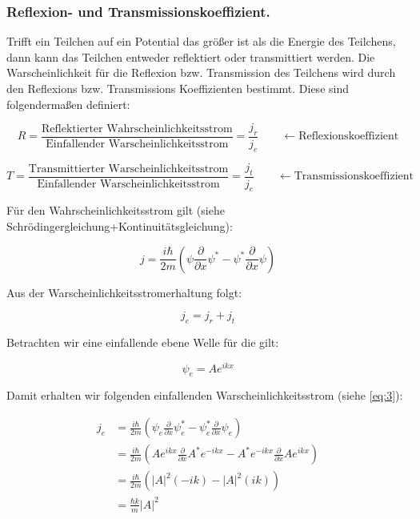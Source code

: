 \subsubsection{Reflexion- und Transmissionskoeffizient.}

Trifft ein Teilchen auf ein Potential das größer ist als die Energie des Teilchens, dann kann das Teilchen entweder reflektiert oder transmittiert werden. Die Warscheinlichkeit für die Reflexion bzw. Transmission des Teilchens wird durch den Reflexions bzw. Transmissions Koeffizienten bestimmt. Diese sind folgendermaßen definiert:

\begin{equation}
  \label{eq:1}
  R = \frac{\text{Reflektierter Wahrscheinlichkeitsstrom}}{\text{Einfallender Warscheinlichkeitsstrom}}  = \frac{j_{r}}{j_{e}}\qquad \leftarrow  \text{Reflexionskoeffizient}
\end{equation}

\begin{equation}
  \label{eq:2}
  T = \frac{\text{Transmittierter Warscheinlichkeitsstrom}}{\text{Einfallender Warscheinlichkeitsstrom}}  = \frac{j_{t}}{j_{e}}\qquad \leftarrow  \text{Transmissionskoeffizient}
\end{equation}


Für den Wahrscheinlichkeitsstrom gilt (siehe Schrödingergleichung+Kontinuitätsgleichung):

\begin{equation}
  \label{eq:3}
  j = \frac{i\hbar}{2m}\left(\psi \frac{\partial}{\partial x} \psi^* - \psi^* \frac{\partial}{\partial x}\psi\right)
\end{equation}

Aus der Warscheinlichkeitsstromerhaltung folgt:

\begin{equation}
  \label{eq:4}
  j_{e} = j_{r} + j_{t}
\end{equation}

Betrachten wir eine einfallende ebene Welle für die gilt:

\begin{equation}
  \label{eq:5}
  \psi_e = Ae^{ikx}
\end{equation}

Damit erhalten wir folgenden einfallenden Warscheinlichkeitsstrom (siehe \eqref{eq:3}):

\begin{align}
  \label{eq:6}
  j_e &= \frac{i\hbar}{2m}\left(\psi_e \frac{\partial}{\partial x} \psi^*_e - \psi^*_e \frac{\partial}{\partial x}\psi_e\right)\\
&= \frac{i\hbar}{2m}\left(Ae^{ikx} \frac{\partial}{\partial x} A^*e^{-ikx} - A^*e^{-ikx}\frac{\partial}{\partial x}Ae^{ikx}\right)\\
&= \frac{i\hbar}{2m}\left(|A|^2(-ik)  -|A|^2(ik)\right)\\
&= \frac{\hbar k}{m}|A|^2
\end{align}


